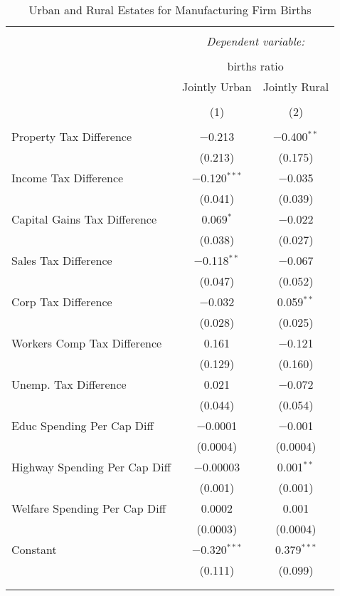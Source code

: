 
\begin{table}[!htbp] \centering 
  \caption{Urban and Rural Estates for  Manufacturing Firm Births} 
  \label{} 
\begin{tabular}{@{\extracolsep{5pt}}lcc} 
\\[-1.8ex]\hline 
\hline \\[-1.8ex] 
 & \multicolumn{2}{c}{\textit{Dependent variable:}} \\ 
\cline{2-3} 
\\[-1.8ex] & \multicolumn{2}{c}{births ratio} \\ 
 & Jointly Urban & Jointly Rural \\ 
\\[-1.8ex] & (1) & (2)\\ 
\hline \\[-1.8ex] 
 Property Tax Difference & $-$0.213 & $-$0.400$^{**}$ \\ 
  & (0.213) & (0.175) \\ 
  Income Tax Difference & $-$0.120$^{***}$ & $-$0.035 \\ 
  & (0.041) & (0.039) \\ 
  Capital Gains Tax Difference & 0.069$^{*}$ & $-$0.022 \\ 
  & (0.038) & (0.027) \\ 
  Sales Tax Difference & $-$0.118$^{**}$ & $-$0.067 \\ 
  & (0.047) & (0.052) \\ 
  Corp Tax Difference & $-$0.032 & 0.059$^{**}$ \\ 
  & (0.028) & (0.025) \\ 
  Workers Comp Tax Difference & 0.161 & $-$0.121 \\ 
  & (0.129) & (0.160) \\ 
  Unemp. Tax Difference & 0.021 & $-$0.072 \\ 
  & (0.044) & (0.054) \\ 
  Educ Spending Per Cap Diff & $-$0.0001 & $-$0.001 \\ 
  & (0.0004) & (0.0004) \\ 
  Highway Spending Per Cap Diff & $-$0.00003 & 0.001$^{**}$ \\ 
  & (0.001) & (0.001) \\ 
  Welfare Spending Per Cap Diff & 0.0002 & 0.001 \\ 
  & (0.0003) & (0.0004) \\ 
  Constant & $-$0.320$^{***}$ & 0.379$^{***}$ \\ 
  & (0.111) & (0.099) \\ 
 \hline \\[-1.8ex] 
\hline 
\hline \\[-1.8ex] 
\end{tabular} 
\end{table} 
